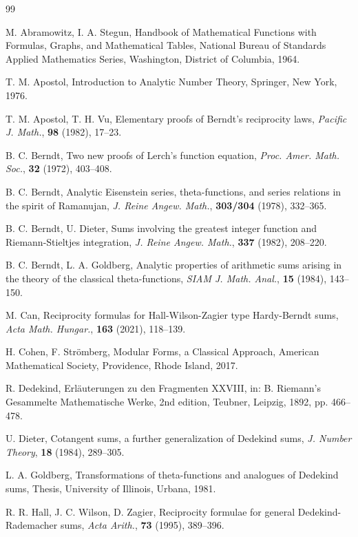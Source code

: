 \documentclass[reqno]{amsart}
\numberwithin{equation}{section}
\begin{document}
\begin{thebibliography}{99}

 M. Abramowitz, I. A. Stegun, Handbook of Mathematical Functions with Formulas, Graphs, and Mathematical Tables, National Bureau of Standards Applied Mathematics Series, Washington, District of Columbia, 1964.

 T. M. Apostol, Introduction to Analytic Number Theory, Springer, New York, 1976.

 T. M. Apostol, T. H. Vu, Elementary proofs of Berndt's reciprocity laws, \emph{Pacific J. Math.}, \textbf{98} (1982), 17--23.

 B. C. Berndt, Two new proofs of Lerch's function equation, \emph{Proc. Amer. Math. Soc.}, \textbf{32} (1972), 403--408.

 B. C. Berndt, Analytic Eisenstein series, theta-functions, and series relations in the spirit of Ramanujan, \emph{J. Reine Angew. Math.}, \textbf{303/304} (1978), 332--365.

 B. C. Berndt, U. Dieter, Sums involving the greatest integer function and Riemann-Stieltjes integration,
\emph{J. Reine Angew. Math.}, \textbf{337} (1982), 208--220.

 B. C. Berndt, L. A. Goldberg, Analytic properties of arithmetic sums arising in the theory of the classical theta-functions, \emph{SIAM J. Math. Anal.}, \textbf{15} (1984), 143--150.

 M. Can, Reciprocity formulas for Hall-Wilson-Zagier type Hardy-Berndt sums, \emph{Acta Math. Hungar.}, \textbf{163} (2021), 118--139.

 H. Cohen, F. Str\"{o}mberg, Modular Forms, a Classical Approach, American Mathematical Society, Providence, Rhode Island, 2017.

 R. Dedekind, Erl\"{a}uterungen zu den Fragmenten XXVIII, in: B. Riemann's Gesammelte Mathematische Werke, 2nd edition, Teubner, Leipzig, 1892, pp. 466--478.

 U. Dieter, Cotangent sums, a further generalization of Dedekind sums, \emph{J. Number Theory}, \textbf{18} (1984), 289--305.

 L. A. Goldberg, Transformations of theta-functions and analogues of Dedekind sums, Thesis, University of Illinois, Urbana, 1981.

 R. R. Hall, J. C. Wilson, D. Zagier, Reciprocity formulae for general Dedekind-Rademacher sums, \emph{Acta Arith.}, \textbf{73} (1995), 389--396.


\end{thebibliography}
\end{document}

